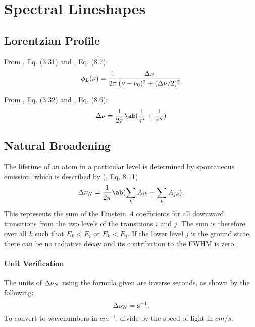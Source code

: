 \documentclass[11pt, twoside, fleqn]{report}
\begin{document}
\section{Spectral Lineshapes}

\subsection{Lorentzian Profile}

From \cite{foxStudentsGuideAtomic2018}, Eq. (3.31) and \cite{hansonSpectroscopyOpticalDiagnostics2016}, Eq. (8.7):
\begin{equation*}
    \phi_L(\nu) = \frac{1}{2\pi}\frac{\adif{\nu}}{(\nu - \nu_0)^2 + (\adif{\nu}/2)^2}
\end{equation*}

From \cite{foxStudentsGuideAtomic2018}, Eq. (3.32) and \cite{hansonSpectroscopyOpticalDiagnostics2016}, Eq. (8.6):
\begin{equation*}
    \adif{\nu} = \frac{1}{2\pi}\ab(\frac{1}{\tau'} + \frac{1}{\tau''})
\end{equation*}

\subsection{Natural Broadening}

The lifetime of an atom in a particular level is determined by spontaneous emission, which is described by (\cite{hansonSpectroscopyOpticalDiagnostics2016}, Eq. 8.11)
\begin{equation*}
    \adif{\nu}_N = \frac{1}{2\pi}\ab(\sum_k A_{ik} + \sum_k A_{jk}).
\end{equation*}
This represents the sum of the Einstein $A$ coefficients for all downward transitions from the two levels of the transitions $i$ and $j$. The sum is therefore over all $k$ such that $E_k < E_i$ or $E_k < E_j$. If the lower level $j$ is the ground state, there can be no radiative decay and its contribution to the FWHM is zero.

\paragraph{Unit Verification}

The units of $\adif{\nu}_N$ using the formula given are inverse seconds, as shown by the following:
\begin{equation*}
    \adif{\nu}_N = \unit{s^{-1}}.
\end{equation*}
To convert to wavenumbers in $\unit{cm^{-1}}$, divide by the speed of light in $\unit{cm/s}$.
\end{document}
